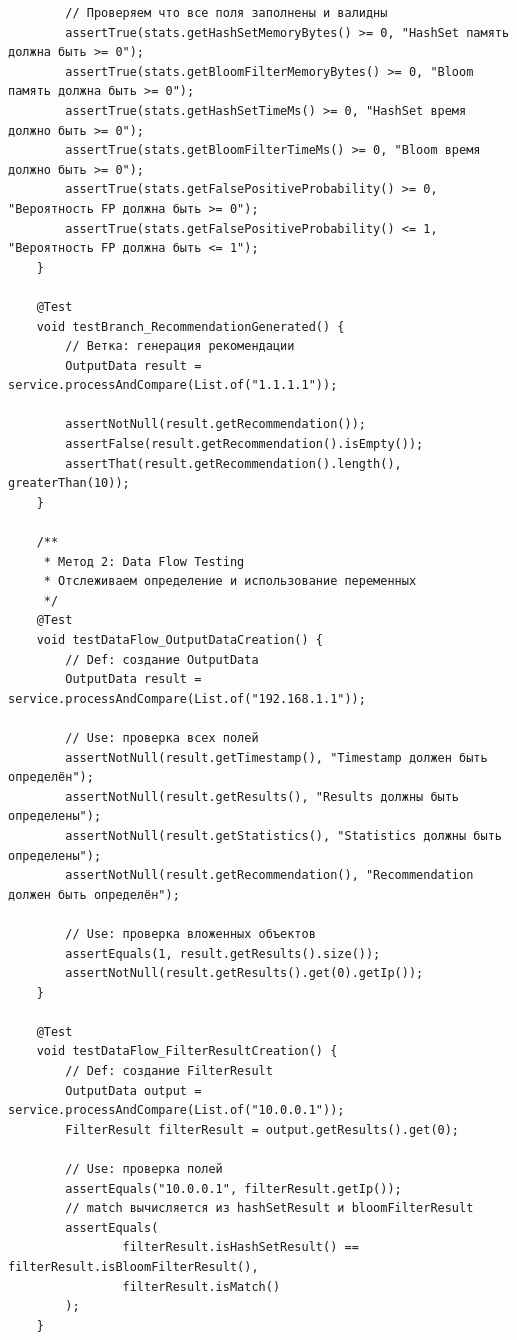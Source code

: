\begin{verbatim}
        // Проверяем что все поля заполнены и валидны
        assertTrue(stats.getHashSetMemoryBytes() >= 0, "HashSet память должна быть >= 0");
        assertTrue(stats.getBloomFilterMemoryBytes() >= 0, "Bloom память должна быть >= 0");
        assertTrue(stats.getHashSetTimeMs() >= 0, "HashSet время должно быть >= 0");
        assertTrue(stats.getBloomFilterTimeMs() >= 0, "Bloom время должно быть >= 0");
        assertTrue(stats.getFalsePositiveProbability() >= 0, "Вероятность FP должна быть >= 0");
        assertTrue(stats.getFalsePositiveProbability() <= 1, "Вероятность FP должна быть <= 1");
    }

    @Test
    void testBranch_RecommendationGenerated() {
        // Ветка: генерация рекомендации
        OutputData result = service.processAndCompare(List.of("1.1.1.1"));

        assertNotNull(result.getRecommendation());
        assertFalse(result.getRecommendation().isEmpty());
        assertThat(result.getRecommendation().length(), greaterThan(10));
    }

    /**
     * Метод 2: Data Flow Testing
     * Отслеживаем определение и использование переменных
     */
    @Test
    void testDataFlow_OutputDataCreation() {
        // Def: создание OutputData
        OutputData result = service.processAndCompare(List.of("192.168.1.1"));

        // Use: проверка всех полей
        assertNotNull(result.getTimestamp(), "Timestamp должен быть определён");
        assertNotNull(result.getResults(), "Results должны быть определены");
        assertNotNull(result.getStatistics(), "Statistics должны быть определены");
        assertNotNull(result.getRecommendation(), "Recommendation должен быть определён");

        // Use: проверка вложенных объектов
        assertEquals(1, result.getResults().size());
        assertNotNull(result.getResults().get(0).getIp());
    }

    @Test
    void testDataFlow_FilterResultCreation() {
        // Def: создание FilterResult
        OutputData output = service.processAndCompare(List.of("10.0.0.1"));
        FilterResult filterResult = output.getResults().get(0);

        // Use: проверка полей
        assertEquals("10.0.0.1", filterResult.getIp());
        // match вычисляется из hashSetResult и bloomFilterResult
        assertEquals(
                filterResult.isHashSetResult() == filterResult.isBloomFilterResult(),
                filterResult.isMatch()
        );
    }


\end{verbatim}
